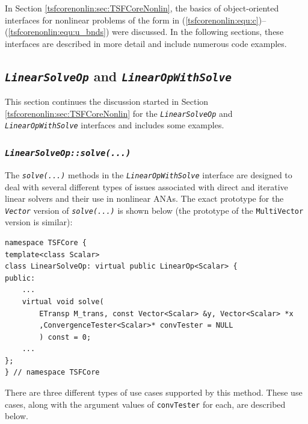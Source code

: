In Section \ref{tsfcorenonlin:sec:TSFCoreNonlin}, the basics of object-oriented
interfaces for nonlinear problems of the form in
(\ref{tsfcorenonlin:equ:c})--(\ref{tsfcorenonlin:equ:u_bnds}) were discussed.  In the
following sections, these interfaces are described in more detail and
include numerous code examples.

%
\subsection{\texttt{\textit{Linear\-Solve\-Op}} and \texttt{\textit{LinearOpWithSolve}}}
\label{tsfcorenonlin:sec:linear_op}
%

This section continues the discussion started in Section
\ref{tsfcorenonlin:sec:TSFCoreNonlin} for the \texttt{\textit{Linear\-Solve\-Op}}
and \texttt{\textit{Linear\-Op\-With\-Solve}} interfaces and includes some examples.

%
\subsubsection{\texttt{\textit{LinearSolveOp::solve(...)}}}
\label{tsfcorenonlin:sec:linear_op_apply_inv}
%

The \texttt{\textit{solve(...)}} methods in the
\texttt{\textit{Linear\-Op\-With\-Solve}} interface are designed to
deal with several different types of issues associated with direct and
iterative linear solvers and their use in nonlinear ANAs.
The exact prototype for the \texttt{\textit{Vector}} version of
\texttt{\textit{solve(...)}} is shown below (the prototype of
the \texttt{MultiVector} version is similar):

{\scriptsize\begin{verbatim}
namespace TSFCore {
template<class Scalar>
class LinearSolveOp: virtual public LinearOp<Scalar> {
public:
    ...
    virtual void solve(
        ETransp M_trans, const Vector<Scalar> &y, Vector<Scalar> *x
        ,ConvergenceTester<Scalar>* convTester = NULL
        ) const = 0;
    ...
};
} // namespace TSFCore
\end{verbatim}}

There are three different types of use cases supported by this method.
These use cases, along with the argument values of \texttt{convTester} for
each, are described below.


